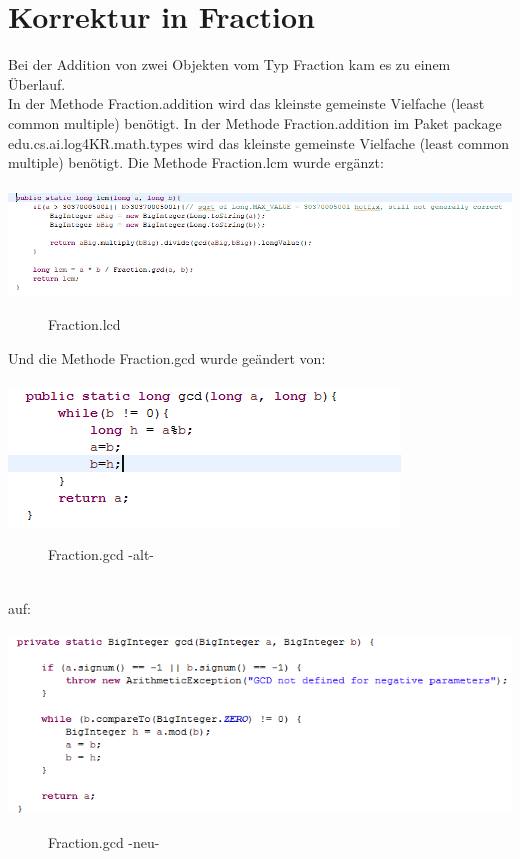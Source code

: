 \documentclass[a4paper, 11pt]{book}
\begin{document}
\section{Korrektur in Fraction}
Bei der Addition von zwei Objekten vom Typ Fraction kam es zu einem Überlauf.\\
In der Methode Fraction.addition wird das kleinste gemeinste Vielfache (least common multiple) benötigt. 
In der Methode Fraction.addition im Paket package edu.cs.ai.log4KR.math.types wird das kleinste gemeinste Vielfache (least common multiple) benötigt. 
Die Methode Fraction.lcm wurde ergänzt:\\
\\
\includegraphics[scale = 1.0]{Graphics/Aenderung_221}
\begin{figure}[h]
	\caption{Fraction.lcd}
\end{figure}

Und die Methode Fraction.gcd wurde geändert von:\\
\\
\includegraphics[scale = 1.0]{Graphics/Aenderung_211}
\begin{figure}[h]
	\caption{Fraction.gcd -alt-}
\end{figure}
\\
auf:\\
\\
\includegraphics[scale = 1.0]{Graphics/Aenderung_212}
\begin{figure}[h]
	\caption{Fraction.gcd -neu-}
\end{figure}
\end{document}
